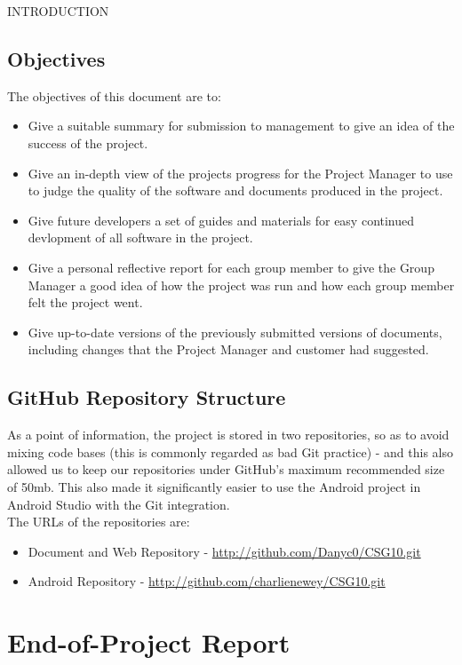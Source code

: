 \documentclass{article}
\begin{document}
\begin{section}{INTRODUCTION}
		\subsection{Objectives}
		The objectives of this document are to:
		\begin{itemize}
			\item{Give a suitable summary for submission to management to give an idea of the success of the project.}
			\item{Give an in-depth view of the projects progress for the Project Manager to use to judge the quality of the software and documents produced in the project.}
			\item{Give future developers a set of guides and materials for easy continued devlopment of all software in the project.}
			\item{Give a personal reflective report for each group member to give the Group Manager a good idea of how the project was run and how each group member felt the project went.}
			\item{Give up-to-date versions of the previously submitted versions of documents, including changes that the Project Manager and customer had suggested.}
		\end{itemize}
	\end{section}
	
	\subsection{GitHub Repository Structure}
	As a point of information, the project is stored in two repositories, so as to avoid mixing code bases (this is commonly regarded as bad Git practice) - and this also allowed us to keep our repositories under GitHub's maximum recommended size of 50mb. This also made it significantly easier to use the Android project in Android Studio with the Git integration. \\
	
	The URLs of the repositories are:
	\begin{itemize}
		\item{Document and Web Repository - \url{http://github.com/Danyc0/CSG10.git}}
		\item{Android Repository - \url{http://github.com/charlienewey/CSG10.git}}
	\end{itemize}
	
	\clearpage
	\section{End-of-Project Report}
\end{document}
